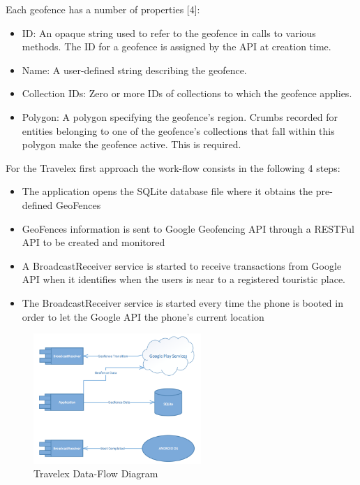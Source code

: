 Each geofence has a number of properties [4]:

\begin{itemize}
  \item ID: An opaque string used to refer to the geofence in calls to various methods. The ID for a geofence is assigned by the API at creation time. 

  \item Name: A user-defined string describing the geofence.

  \item Collection IDs: Zero or more IDs of collections to which the geofence applies. 

  \item Polygon: A polygon specifying the geofence's region. Crumbs recorded for entities belonging to one of the geofence's collections that fall within this polygon make the geofence active. This is required. 
\end{itemize}

For the  Travelex first approach the work-flow consists in the following 4 steps:\\

\begin{itemize}
  \item The application opens the  SQLite database file where it obtains the pre-defined GeoFences
  \item GeoFences information is sent to Google Geofencing API through a RESTFul API to be created and monitored
  \item A BroadcastReceiver service is started to receive transactions from Google API when it identifies when
        the users is near to a registered touristic place.
  \item The BroadcastReceiver service is started every time the phone is booted in order to let the Google API the phone's
        current location
\end{itemize}

\begin{figure}[ht]
  \centering
  \includegraphics[width=2.5in]{travelex_flow}
  \caption{Travelex Data-Flow Diagram}
  \label{fig_sim}
\end{figure} 


